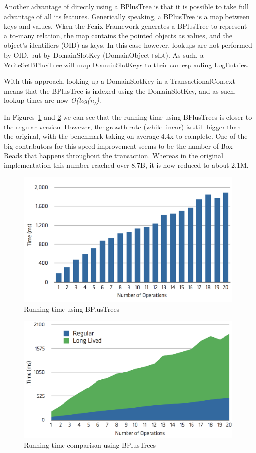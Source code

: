 Another advantage of directly using a BPlusTree is that it is possible
to take full advantage of all its features. Generically speaking, a
BPlusTree is a map between keys and values. When the Fenix Framework
generates a BPlusTree to represent a to-many relation, the map
contains the pointed objects as values, and the object's identifiers
(OID) as keys. In this case however, lookups are not performed by OID,
but by DomainSlotKey (DomainObject+slot). As such, a WriteSetBPlusTree
will map DomainSlotKeys to their corresponding LogEntries.

With this approach, looking up a DomainSlotKey in a
TransactionalContext means that the BPlusTree is indexed using the
DomainSlotKey, and as such, lookup times are now {\it O(log(n))}.

In Figures~\ref{fig:runtimeBPlus} and \ref{fig:comparisonBPlus} we can
see that the running time using BPlusTrees is closer to the regular
version. However, the growth rate (while linear) is still bigger than
the original, with the benchmark taking on average 4.4x to
complete. One of the big contributors for this speed improvement seems
to be the number of Box Reads that happens throughout the
transaction. Whereas in the original implementation this number
reached over 8.7B, it is now reduced to about 2.1M.

\begin{figure}
\centering
\includegraphics[width=0.9\linewidth]{time-long-bplus}
\caption{Running time using BPlusTrees}
\label{fig:runtimeBPlus}
\end{figure}

\begin{figure}
\centering
\includegraphics[width=0.9\linewidth]{comparison-bplus}
\caption{Running time comparison using BPlusTrees}
\label{fig:comparisonBPlus}
\end{figure}

